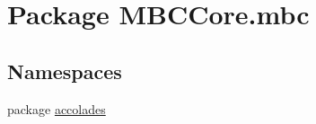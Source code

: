 \hypertarget{namespace_m_b_c_core_1_1mbc}{\section{Package M\-B\-C\-Core.\-mbc}
\label{namespace_m_b_c_core_1_1mbc}
}
\subsection*{Namespaces}
\begin{DoxyCompactItemize}
\item 
package \hyperlink{namespace_m_b_c_core_1_1mbc_1_1accolades}{accolades}
\end{DoxyCompactItemize}

